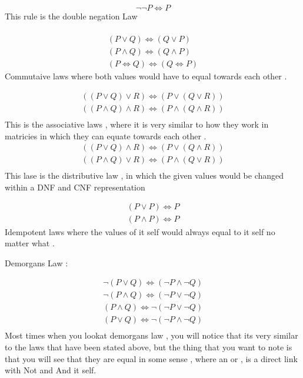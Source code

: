 \documentclass{article}
\theoremstyle{mytheoremstyle}
\theoremstyle{mytheoremstyle}
\theoremstyle{myproblemstyle}
\begin{document}
\[\neg\neg P \iff P \]
This rule is the double negation Law \\ \\

\[ \begin{array}{c}
		(P \lor Q) \iff (Q \lor P)   \\
		(P \land Q) \iff (Q \land P) \\
		(P \iff Q) \iff (Q \iff P)
	\end{array}\]
Commutaive laws where both values would have to equal towards each other  .


\[\begin{array}{c}
		((P \lor Q) \lor R) \iff (P \lor (Q \lor R))    \\
		((P \land Q) \land R) \iff (P \land(Q \land R)) \\
	\end{array}\]
This is the associative laws , where it is very similar to how they work in matricies in which they can equate towards each other . \\

\[\begin{array}{c}
		((P \lor Q) \land R) \iff (P \lor (Q \land R)) \\
		((P \land Q) \lor R) \iff (P \land(Q \lor R))  \\
	\end{array}\]
This lase is the distributive law , in which the given values would be changed within a DNF and CNF representation

\[\begin{array}{c}
		(P \lor P) \iff P \\
		(P \land P) \iff P
	\end{array}\]
Idempotent laws where the values of it self would always equal to it self no matter what .

\item Demorgans Law :

\[\begin{array}{c}
		\neg(P \lor Q) \iff (\neg P \land \neg Q) \\
		\neg(P \land Q) \iff (\neg P \lor \neg Q) \\
		(P \land Q) \iff \neg(\neg P \lor \neg Q) \\
		(P \lor Q) \iff \neg(\neg P \land \neg Q) \\
	\end{array}\]
Most times when you lookat demorgans law , you will notice that its very similar to the laws that have been stated above, but the thing that you want to note is that you will see that they are equal in some sense ,  where an or , is a direct link with Not  and And it self.
\end{document}
